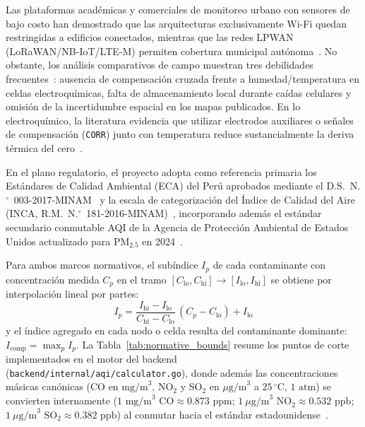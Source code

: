 \documentclass[conference]{IEEEtran}
\begin{document}
Las plataformas académicas y comerciales de monitoreo urbano con sensores de bajo costo han demostrado que las arquitecturas exclusivamente Wi-Fi quedan restringidas a edificios conectados, mientras que las redes LPWAN (LoRaWAN/NB-IoT/LTE-M) permiten cobertura municipal autónoma~\cite{mead2013electrochemical,morawska2018applications}. No obstante, los análisis comparativos de campo muestran tres debilidades frecuentes~\cite{castell2017lowcost,kang2022calibration}: ausencia de compensación cruzada frente a humedad/temperatura en celdas electroquímicas, falta de almacenamiento local durante caídas celulares y omisión de la incertidumbre espacial en los mapas publicados. En lo electroquímico, la literatura evidencia que utilizar electrodos auxiliares o señales de compensación (\texttt{CORR}) junto con temperatura reduce sustancialmente la deriva térmica del cero~\cite{mead2013electrochemical,zimmerman2018machinemean}.

En el plano regulatorio, el proyecto adopta como referencia primaria los Estándares de Calidad Ambiental (ECA) del Perú aprobados mediante el D.S.~N.$^\circ$~003-2017-MINAM~\cite{minam2017eca} y la escala de categorización del Índice de Calidad del Aire (INCA, R.M.~N.$^\circ$~181-2016-MINAM)~\cite{minam2016inca}, incorporando además el estándar secundario conmutable AQI de la Agencia de Protección Ambiental de Estados Unidos actualizado para $\text{PM}_{2.5}$ en 2024~\cite{usepa2024aqi}.

Para ambos marcos normativos, el subíndice $I_p$ de cada contaminante con concentración medida $C_p$ en el tramo $[C_{\mathrm{lo}}, C_{\mathrm{hi}}] \rightarrow [I_{\mathrm{lo}}, I_{\mathrm{hi}}]$ se obtiene por interpolación lineal por partes:
\begin{equation}
I_p = \frac{I_{\mathrm{hi}} - I_{\mathrm{lo}}}{C_{\mathrm{hi}} - C_{\mathrm{lo}}}\,(C_p - C_{\mathrm{lo}}) + I_{\mathrm{lo}}
\label{eq:subindex}
\end{equation}
y el índice agregado en cada nodo o celda resulta del contaminante dominante: $I_{\mathrm{comp}} = \max_p I_p$. La Tabla~\ref{tab:normative_bounds} resume los puntos de corte implementados en el motor del backend (\texttt{backend/internal/aqi/calculator.go}), donde además las concentraciones másicas canónicas ($\text{CO}$ en $\text{mg/m}^3$, $\text{NO}_2$ y $\text{SO}_2$ en $\mu\text{g/m}^3$ a $25\,^\circ\text{C}$, $1\text{ atm}$) se convierten internamente ($1\text{ mg/m}^3\text{ CO} \approx 0.873\text{ ppm}$; $1\ \mu\text{g/m}^3\text{ NO}_2 \approx 0.532\text{ ppb}$; $1\ \mu\text{g/m}^3\text{ SO}_2 \approx 0.382\text{ ppb}$) al conmutar hacia el estándar estadounidense~\cite{usepa2024aqi}.
\end{document}
